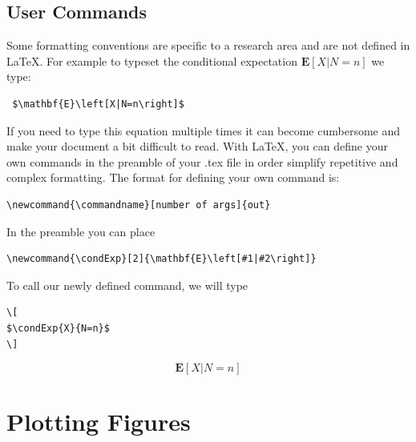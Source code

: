 \documentclass{article}
\newcommand{\condExp}[2]{\mathbf{E}\left[#1|#2\right]}
\begin{document}
\subsection{User Commands}\label{subsec:usercommands}


Some formatting conventions are specific to a research area and are not defined in \LaTeX. For example to typeset the conditional expectation $\mathbf{E}\left[X|N=n\right]$ we type:

\begin{verbatim}
 $\mathbf{E}\left[X|N=n\right]$
\end{verbatim}

If you need to type this equation multiple times it can become cumbersome and make your document a bit difficult to read. With \LaTeX, you can define your own commands in the preamble of your .tex file in order simplify repetitive and complex formatting. The format for defining your own command is:

\begin{verbatim}
\newcommand{\commandname}[number of args]{out}
\end{verbatim}

In the preamble you can place

\begin{verbatim}
\newcommand{\condExp}[2]{\mathbf{E}\left[#1|#2\right]}
\end{verbatim}

To call our newly defined command, we will type

\begin{verbatim}
\[
$\condExp{X}{N=n}$
\]
\end{verbatim}

\[
\condExp{X}{N=n}
\]


\clearpage

\section{Plotting Figures}\label{sec:figures}
\end{document}
